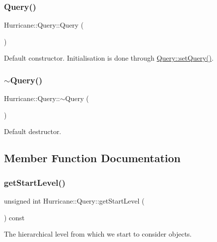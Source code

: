 \subsubsection{\texorpdfstring{Query()}{Query()}}
{\footnotesize\ttfamily Hurricane\+::\+Query\+::\+Query (\begin{DoxyParamCaption}{ }\end{DoxyParamCaption})}

Default constructor. Initialisation is done through \hyperlink{classHurricane_1_1Query_a63c50b61799b729ff4b2e7e291959b4d}{Query\+::set\+Query()}. \mbox{\label{classHurricane_1_1Query_acd18d98c6bf30dd049916508a397391a}} 
\subsubsection{\texorpdfstring{$\sim$\+Query()}{~Query()}}
{\footnotesize\ttfamily Hurricane\+::\+Query\+::$\sim$\+Query (\begin{DoxyParamCaption}{ }\end{DoxyParamCaption})\hspace{0.3cm}{\ttfamily [virtual]}}

Default destructor. 

\subsection{Member Function Documentation}
\mbox{\label{classHurricane_1_1Query_a7aac7fbdc96df19e7249bf8993eb355f}} 
\subsubsection{\texorpdfstring{get\+Start\+Level()}{getStartLevel()}}
{\footnotesize\ttfamily unsigned int Hurricane\+::\+Query\+::get\+Start\+Level (\begin{DoxyParamCaption}{ }\end{DoxyParamCaption}) const\hspace{0.3cm}{\ttfamily [inline]}}

The hierarchical level from which we start to consider objects. \mbox{\label{classHurricane_1_1Query_a3544d22dbb0685208c590cef09412796}} 

